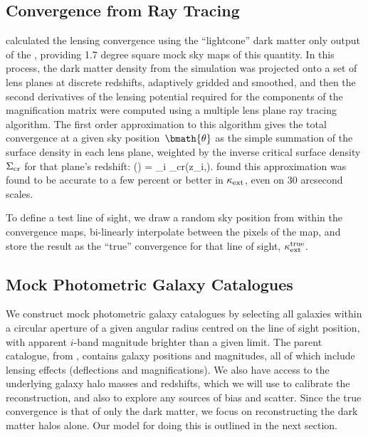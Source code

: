 \documentclass[useAMS,usenatbib,a4paper]{mn2e}
\begin{document}

\subsection{Convergence from Ray Tracing}
\label{sec:MS:raytracing}

\citet{HilbertEtal2009} calculated the lensing convergence using the
``lightcone'' dark matter only 
output of the \MS, providing 1.7 degree square 
mock sky maps of this
quantity. In this process, the dark matter density from the simulation
was projected onto a set of lens planes at discrete redshifts,
adaptively gridded and smoothed, and then the second derivatives of the 
lensing potential required for the components of the magnification
matrix were computed using a multiple lens plane ray tracing algorithm.
The first order approximation to this algorithm \citep[equation 17
of][]{HilbertEtal2009} gives the total convergence at a given sky
position~$\bmath{\theta}$ as the simple summation of the surface density
in each lens plane, weighted by the inverse critical surface density
$\Sigma_{\rm cr}$ for that plane's redshift:
\be
\kappax(\bmath{\theta}) = \sum_i 
                                     {\Sigma_{\rm cr}(z_i,\zs)}.
\ee
\citet{HilbertEtal2009} found this approximation was found to be accurate to a few percent or better
in $\kappa_{\rm ext}$, even on 30 arcsecond scales.

To define a test line of sight, we draw a random sky position from
within the convergence maps, bi-linearly interpolate between the pixels
of the map, and store the result as the ``true'' convergence for that
line of sight, $\kappa_{\rm ext}^{\rm true}$. 


\subsection{Mock Photometric Galaxy Catalogues}
\label{sec:MS:mocks}

We construct mock photometric galaxy catalogues by selecting all \MS
galaxies within a circular aperture of a given angular radius centred on
the line of sight position, with apparent $i$-band magnitude brighter
than a given limit. The parent catalogue, from \citet{HilbertEtal2011},
contains galaxy positions and magnitudes, all of which include lensing
effects (deflections and magnifications). We also have access to the
underlying galaxy halo masses and redshifts, which we will use to
calibrate the reconstruction, and also to explore any sources of bias
and scatter. Since the true convergence is that of only the dark matter,
we focus on reconstructing the dark matter halos alone. Our model for
doing this is outlined in the next section. 
\end{document}

